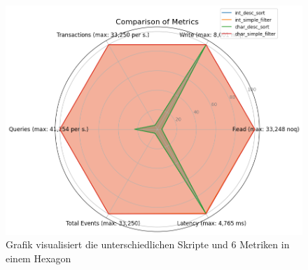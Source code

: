 \begin{figure}[!ht]
    \centering
    \includegraphics[width=.6\textwidth]{PNGs/Data_Types/Simpler/statistics}
    \caption[Data-Types-Simpler: Statistiken]{Grafik visualisiert die unterschiedlichen Skripte und 6 Metriken in einem Hexagon}
    \label{fig:data-types-simpler-statistics}
\end{figure}

